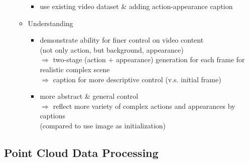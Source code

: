 \begin{itemize}
\begin{itemize}
\begin{itemize}
		\item use existing video dataset \& adding action-appearance caption
		\end{itemize}
	\item Understanding
		\begin{itemize}
		\item demonstrate ability for finer control on video content \\ 
		(not only action, but background, appearance) \\ 
		$\Rightarrow$ two-stage (action + appearance) generation for each frame for realistic complex scene\\
		$\Rightarrow$ caption for more descriptive control (v.s. initial frame)
		\item more abstract \& general control \\ 
		$\Rightarrow$ reflect more variety of complex actions and appearances by captions \\ 
		(compared to use image as initialization)
		\end{itemize}
	\end{itemize}
\end{itemize}

\subsection{Point Cloud Data Processing}
